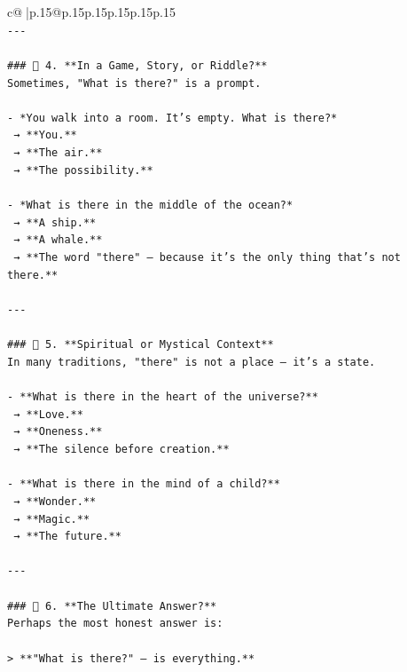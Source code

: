 \documentclass{article}
\begin{document}
{\begin{supertabular}{c@{$\;$}|p{.15\linewidth}@{}p{.15\linewidth}p{.15\linewidth}p{.15\linewidth}p{.15\linewidth}p{.15\linewidth}}
{{{\\ 
\texttt{{-}{-}{-}} \\
\\ 
\texttt{\#\#\# 🔹 4. **In a Game, Story, or Riddle?**  } \\
\texttt{Sometimes, "What is there?" is a prompt.} \\
\\ 
\texttt{{-} *You walk into a room. It’s empty. What is there?*  } \\
\texttt{  → **You.**  } \\
\texttt{  → **The air.**  } \\
\texttt{  → **The possibility.**} \\
\\ 
\texttt{{-} *What is there in the middle of the ocean?*  } \\
\texttt{  → **A ship.**  } \\
\texttt{  → **A whale.**  } \\
\texttt{  → **The word "there" — because it’s the only thing that’s not there.**} \\
\\ 
\texttt{{-}{-}{-}} \\
\\ 
\texttt{\#\#\# 🔹 5. **Spiritual or Mystical Context**  } \\
\texttt{In many traditions, "there" is not a place — it’s a state.} \\
\\ 
\texttt{{-} **What is there in the heart of the universe?**  } \\
\texttt{  → **Love.**  } \\
\texttt{  → **Oneness.**  } \\
\texttt{  → **The silence before creation.**} \\
\\ 
\texttt{{-} **What is there in the mind of a child?**  } \\
\texttt{  → **Wonder.**  } \\
\texttt{  → **Magic.**  } \\
\texttt{  → **The future.**} \\
\\ 
\texttt{{-}{-}{-}} \\
\\ 
\texttt{\#\#\# 🔹 6. **The Ultimate Answer?**  } \\
\texttt{Perhaps the most honest answer is:} \\
\\ 
\texttt{> **"What is there?" — is everything.**  } \\
}}}
\end{supertabular}}
\end{document}
